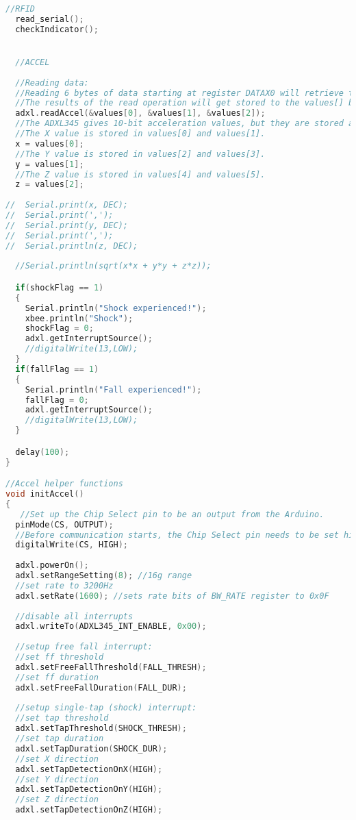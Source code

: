 \begin{lstlisting}[frame = single, language = C]
  //RFID
  read_serial();
  checkIndicator();


  //ACCEL
  
  //Reading data:  
  //Reading 6 bytes of data starting at register DATAX0 will retrieve the x,y and z acceleration values from the ADXL345.
  //The results of the read operation will get stored to the values[] buffer.
  adxl.readAccel(&values[0], &values[1], &values[2]);
  //The ADXL345 gives 10-bit acceleration values, but they are stored as bytes (8-bits). To get the full value, two bytes must be combined for each axis.
  //The X value is stored in values[0] and values[1].
  x = values[0];
  //The Y value is stored in values[2] and values[3].
  y = values[1];
  //The Z value is stored in values[4] and values[5].
  z = values[2];
    
//  Serial.print(x, DEC);
//  Serial.print(',');
//  Serial.print(y, DEC);
//  Serial.print(',');
//  Serial.println(z, DEC);
    
  //Serial.println(sqrt(x*x + y*y + z*z));

  if(shockFlag == 1)
  {
    Serial.println("Shock experienced!");
    xbee.println("Shock");
    shockFlag = 0;
    adxl.getInterruptSource();
    //digitalWrite(13,LOW);
  }
  if(fallFlag == 1)
  {
    Serial.println("Fall experienced!");
    fallFlag = 0;
    adxl.getInterruptSource();
    //digitalWrite(13,LOW);
  }

  delay(100); 
}

//Accel helper functions
void initAccel()
{
   //Set up the Chip Select pin to be an output from the Arduino.
  pinMode(CS, OUTPUT);
  //Before communication starts, the Chip Select pin needs to be set high.
  digitalWrite(CS, HIGH);
  
  adxl.powerOn();
  adxl.setRangeSetting(8); //16g range
  //set rate to 3200Hz
  adxl.setRate(1600); //sets rate bits of BW_RATE register to 0x0F
  
  //disable all interrupts
  adxl.writeTo(ADXL345_INT_ENABLE, 0x00);
    
  //setup free fall interrupt:
  //set ff threshold
  adxl.setFreeFallThreshold(FALL_THRESH);
  //set ff duration
  adxl.setFreeFallDuration(FALL_DUR);
  
  //setup single-tap (shock) interrupt:
  //set tap threshold
  adxl.setTapThreshold(SHOCK_THRESH);
  //set tap duration
  adxl.setTapDuration(SHOCK_DUR);
  //set X direction
  adxl.setTapDetectionOnX(HIGH);
  //set Y direction
  adxl.setTapDetectionOnY(HIGH);
  //set Z direction
  adxl.setTapDetectionOnZ(HIGH);
  

\end{lstlisting}
